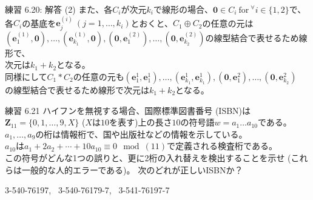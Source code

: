 \documentclass[dvipdfmx,10pt,jsarticle]{beamer}
\begin{document}
  \begin{frame}{練習 6.20: 解答 (2)}
    また、各$C_i$が次元$k_i$で線形の場合、$\mathbf{0} \in C_i \ \text{for} \ {}^\forall i \in \lbrace 1, 2 \rbrace$で、\\
    各$C_i$の基底を$\mathbf{e}_j^{(i)} \ (j = 1 , \ldots, k_i)$とおくと、$C_1 \oplus C_2$の任意の元は \\
    $(\mathbf{e}_1^{(1)},\mathbf{0}) , \ldots, (\mathbf{e}_{k_1}^{(1)}, \mathbf{0}), (\mathbf{0}, \mathbf{e}_1^{(2)}), \ldots, (\mathbf{0}, \mathbf{e}_{k_2}^{(2)})$の線型結合で表せるため線形で、 \\
    次元は$k_1 + k_2$となる。\\
    同様にして$C_1 \ast C_2$の任意の元も$(\mathbf{e}_1^1,\mathbf{e}_1^1) , \ldots, (\mathbf{e}_{k_1}^1, \mathbf{e}_{k_1}^1), (\mathbf{0}, \mathbf{e}_1^2), \ldots, (\mathbf{0}, \mathbf{e}_{k_2}^2)$ \\
    の線型結合で表せるため線形で次元は$k_1 + k_2$となる。
    
  \end{frame}

  \begin{frame}{練習 6.21}
    ハイフンを無視する場合、国際標準図書番号 (ISBN)は$\mathbf{Z}_{11} = \lbrace 0, 1, \ldots, 9, X\rbrace$ ($X$は$10$を表す)上の長さ$10$の符号語$w = a_1 \ldots a_{10}$である。\\
    $a_1, \ldots, a_9$の桁は情報桁で、国や出版社などの情報を示している。 \\ $a_{10}$は$a_1 + 2a_2 + \cdots + 10 a_{10} \equiv 0 \mod (11)$で定義される検査桁である。 \\
    この符号がどんな1つの誤りと、更に2桁の入れ替えを検出することを示せ (これらは一般的な人的エラーである)。 次のどれが正しいISBNか？ \\
    \begin{center}
        3-540-76197, \ 3-540-76179-7, \ 3-541-76197-7 
    \end{center}
  \end{frame}
\end{document}
